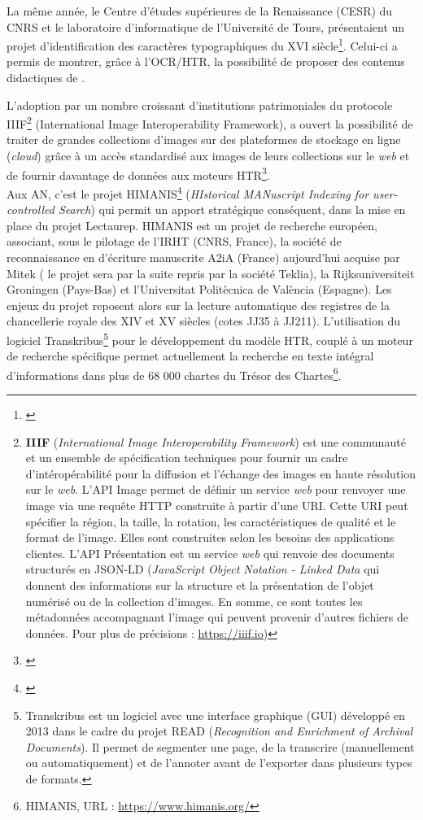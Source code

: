 La même année, le Centre d'études supérieures de la Renaissance (CESR) du CNRS et le laboratoire d'informatique de l'Université de Tours, présentaient un projet d'identification des caractères typographiques du XVI siècle\footnote{\cite{rayar_exploiting_2012}}. Celui-ci a permis de montrer, grâce à l'OCR/HTR, la possibilité de proposer des contenus didactiques de . 

L'adoption par un nombre croissant d’institutions patrimoniales du protocole IIIF\footnote{\textbf{IIIF} (\textit{International Image Interoperability Framework}) est une communauté et un ensemble de spécification techniques pour fournir un cadre d'intéropérabilité pour la diffusion et l'échange des images en haute résolution sur le \textit{web}. L'API Image permet de définir un service \textit{web} pour renvoyer une image via une requête HTTP construite à partir d'une URI. Cette URI peut spécifier la région, la taille, la rotation, les caractéristiques de qualité et le format de l'image. Elles sont construites selon les besoins des applications clientes. L'API Présentation est un service \textit{web} qui renvoie des documents structurés en JSON-LD (\textit{JavaScript Object Notation - Linked Data} qui donnent des informations sur la structure et la présentation de l'objet numérisé ou de la collection d'images. En somme, ce sont toutes les métadonnées accompagnant l'image qui peuvent provenir d'autres fichiers de données. Pour plus de précisions : \url{https://iiif.io})} (International Image Interoperability Framework), a ouvert la possibilité de traiter de grandes collections d’images sur des plateformes de stockage en ligne (\textit{cloud}) grâce à un accès standardisé aux images de leurs collections sur le \textit{web} et de fournir davantage de données aux moteurs HTR\footnote{\cite{boros_automatic_2019}}.\\

Aux AN, c'est le projet HIMANIS\footnote{\cite{hamel_recherche_2017}} (\textit{HIstorical MANuscript Indexing for user-controlled Search}) qui permit un apport stratégique conséquent, dans la mise en place du projet Lectaurep. HIMANIS est un projet de recherche européen, associant, sous le pilotage de l'IRHT (CNRS, France), la société de reconnaissance en d'écriture manuscrite A2iA (France) aujourd'hui acquise par Mitek ( le projet sera par la suite repris par la société Teklia), la Rijksuniversiteit Groningen (Pays-Bas) et l'Universitat Politècnica de València (Espagne). Les enjeux du projet reposent alors sur la lecture automatique des registres de la chancellerie royale des XIV et XV siècles (cotes JJ35 à JJ211). L'utilisation du logiciel Transkribus\footnote{Transkribus est un logiciel avec une interface graphique (GUI) développé en 2013 dans le cadre du projet READ (\textit{Recognition and Enrichment of Archival Documents}). Il permet de segmenter une page, de la transcrire (manuellement ou automatiquement) et de l'annoter avant de l’exporter dans plusieurs types de formats.} pour le développement du modèle HTR, couplé à un moteur de recherche spécifique permet actuellement la recherche en texte intégral d'informations dans plus de 68 000 chartes du Trésor des Chartes\footnote{HIMANIS, URL : \url{https://www.himanis.org/}}. 

